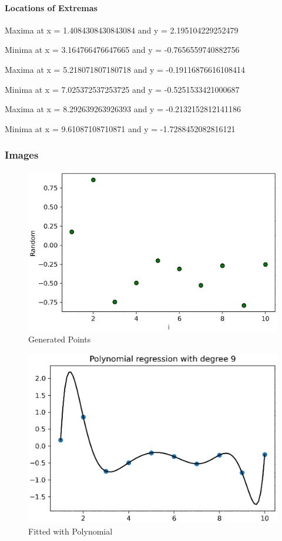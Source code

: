 \paragraph{Locations of Extremas}

\begin{description}
	\item Maxima at x = 1.4084308430843084 and y = 2.195104229252479
	\item Minima at x = 3.164766476647665 and y = -0.7656559740882756
	\item Maxima at x = 5.218071807180718 and y = -0.19116876616108414
	\item Minima at x = 7.025372537253725 and y = -0.5251533421000687
	\item Maxima at x = 8.292639263926393 and y = -0.2132152812141186
	\item Minima at x = 9.61087108710871 and y = -1.7288452082816121
\end{description}


\subsubsection{Images}

\begin{figure}[!ht]
	\includegraphics{question_1/Points.eps} 
	\caption{Generated Points}
\end{figure} 

\begin{figure}[!ht]
	\includegraphics{question_1/Fitted.eps} 
	\caption{Fitted with Polynomial}
\end{figure} 
